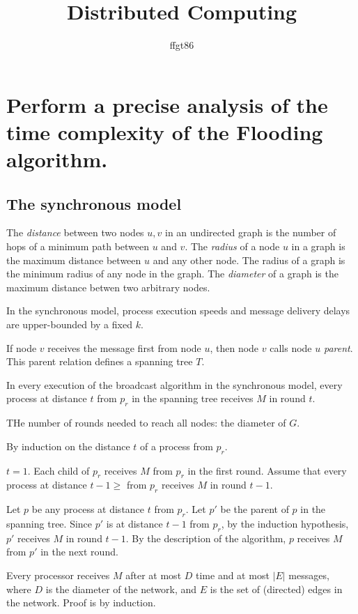 \documentclass[11pt]{article} %
\title{Distributed Computing}
\author{ffgt86}
\begin{document}
\maketitle

\section{Perform a precise analysis of the time complexity of the Flooding algorithm.}
\subsection{The synchronous model}

The \textit{distance} between two nodes $u, v$ in an undirected graph is the number of hops of a minimum path between $u$ and $v$. The \textit{radius} of a node $u$ in a graph is the maximum distance between $u$ and any other node. The radius of a graph is the minimum radius of any node in the graph. The \textit{diameter} of a graph is the maximum distance betwen two arbitrary nodes. 

In the synchronous model, process execution speeds and message delivery delays are upper-bounded by a fixed $k$.

If node $v$ receives the message first from node $u$, then node $v$ calls node $u$ \textit{parent}. This parent relation defines a spanning tree $T$. 

In every execution of the broadcast algorithm in the synchronous model, every process at distance $t$ from $p_r$ in the spanning tree receives $M$ in round $t$. 

THe number of rounds needed to reach all nodes: the diameter of $G$.

By induction on the distance $t$ of a process from $p_r$. 

$t = 1$. Each child of $p_r$ receives $M$ from $p_r$ in the first round.
Assume that every process at distance $t - 1 \geq$ from $p_r$ receives $M$ in round $t - 1$. 

Let $p$ be any process at distance $t$ from $p_r$. Let $p'$ be the parent of $p$ in the spanning tree. Since $p'$ is at distance $t - 1$ from $p_r$, by the induction hypothesis, $p'$ receives $M$ in round $t - 1$. By the description of the algorithm, $p$ receives $M$ from $p'$ in the next round.

Every processor receives $M$ after at most $D$ time and at most $|E|$ messages, where $D$ is the diameter of the network, and $E$ is the set of (directed) edges in the network. Proof is by induction.
\end{document}

